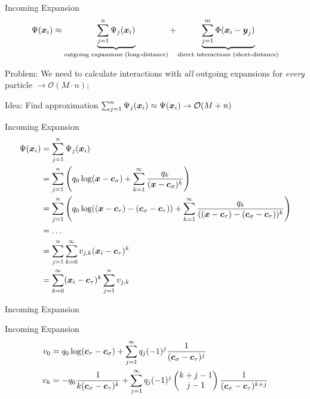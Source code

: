 \begin{frame}{Incoming Expansion}
  \begin{equation}
    \Psi(\boldsymbol{x}_i)
    \approx \underbrace{\sum_{j=1}^n \Psi_j(\boldsymbol{x}_i)}_\text{outgoing expansions (long-distance)}
    + \underbrace{\sum_{j=1}^m \Phi(\boldsymbol{x}_i - \boldsymbol{y}_j)}_\text{direct interactions (short-distance)}
  \end{equation}

  Problem: We need to calculate interactions with \emph{all} outgoing expansions for \emph{every} particle $\rightarrow \mathcal{O}(M\cdot n)$;

  Idea: Find approximation $\sum_{j=1}^n \Psi_j(\boldsymbol{x}_i) \approx \Psi(\boldsymbol{x}_i) \rightarrow \mathcal{O}(M+n)$
\end{frame}

\begin{frame}{Incoming Expansion}
  \begin{align}
    \Psi(\boldsymbol{x}_i) &= \sum_{j=1}^n \Psi_j(\boldsymbol{x}_i) \\
    &= \sum_{j=1}^n \left( q_0 \log(\boldsymbol{x} - \boldsymbol{c}_\sigma) + \sum_{k=1}^\infty \frac{q_k}{(\boldsymbol{x} - \boldsymbol{c}_\sigma)^k} \right) \\
    &= \sum_{j=1}^n \left( q_0 \log((\boldsymbol{x} -\boldsymbol{c}_\tau) - (\boldsymbol{c}_\sigma - \boldsymbol{c}_\tau)) + \sum_{k=1}^\infty \frac{q_k}{((\boldsymbol{x} -\boldsymbol{c}_\tau) - (\boldsymbol{c}_\sigma - \boldsymbol{c}_\tau))^k} \right) \\
    &= \dots \\
    &= \sum_{j=1}^n \sum_{k=0}^\infty v_{j,k} (\boldsymbol{x}_i - \boldsymbol{c}_\tau)^k \\
    &= \sum_{k=0}^\infty (\boldsymbol{x}_i - \boldsymbol{c}_\tau)^k \sum_{j=1}^n v_{j,k}
  \end{align}
\end{frame}

\begin{frame}{Incoming Expansion}
  \begin{block}{Incoming Expansion}
    \begin{equation}
      \begin{split}
        v_0 &= q_0 \log(\boldsymbol{c}_\tau - \boldsymbol{c}_\sigma) + \sum_{j=1}^\infty q_j (-1)^j \frac 1 {(\boldsymbol{c}_\sigma - \boldsymbol{c}_\tau)^j} \\
        v_k &= -q_0 \frac 1 {k(\boldsymbol{c}_\sigma - \boldsymbol{c}_\tau)^k} + \sum_{j=1}^\infty q_j (-1)^j \begin{pmatrix}k+j-1\\j-1\end{pmatrix} \frac 1 {(\boldsymbol{c}_\sigma - \boldsymbol{c}_\tau)^{k+j}} \\
      \end{split}
    \end{equation}
  \end{block}
\end{frame}

